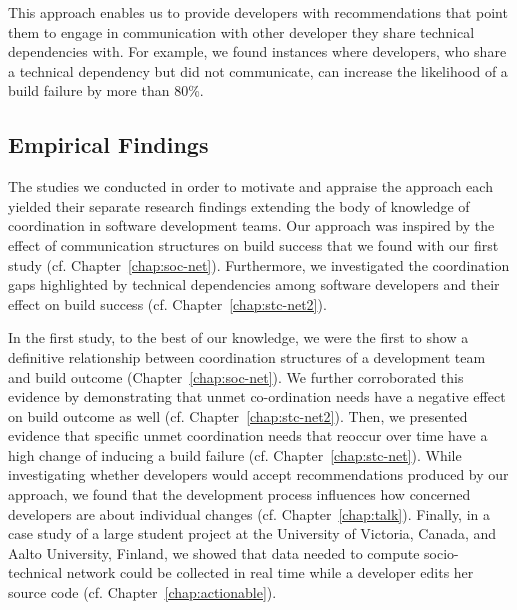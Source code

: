 This approach enables us to provide developers with recommendations that point them to engage in communication with other developer they share technical dependencies with.
For example, we found instances where developers, who share a technical dependency but did not communicate, can increase the likelihood of a build failure by more than 80\%.


\subsection{Empirical Findings}
The studies we conducted in order to motivate and appraise the approach each yielded their separate research findings extending the body of knowledge of coordination in software development teams. Our approach was inspired by the effect of communication structures on build success that we found with our first study (cf. Chapter~\ref{chap:soc-net}).
Furthermore, we investigated the coordination gaps highlighted by technical dependencies among software developers and their effect on build success (cf. Chapter~\ref{chap:stc-net2}).

In the first study, to the best of our knowledge, we were the first to show a definitive relationship between coordination structures of a development team and build outcome (Chapter~\ref{chap:soc-net}).
We further corroborated this evidence by demonstrating that unmet co-ordination needs have a negative effect on build outcome as well (cf. Chapter~\ref{chap:stc-net2}).
Then, we presented evidence that specific unmet coordination needs that reoccur over time have a high change of inducing a build failure (cf. Chapter~\ref{chap:stc-net}).
While investigating whether developers would accept recommendations produced by our approach, we found that the development process influences how concerned developers are about individual changes (cf. Chapter~\ref{chap:talk}).
Finally, in a case study of a large student project at the University of Victoria, Canada, and Aalto University, Finland, we showed that data needed to compute socio-technical network could be collected in real time while a developer edits her source code (cf. Chapter~\ref{chap:actionable}).

